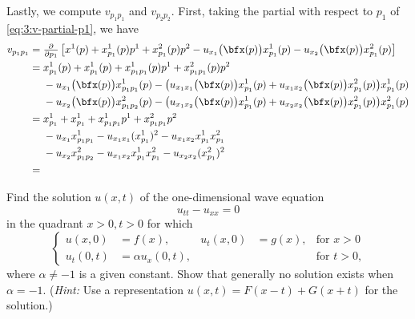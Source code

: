 \begin{solution}
  Lastly, we compute \(v_{p_1p_1}\) and \(v_{p_2p_2}\). First, taking the
  partial with respect to \(p_1\) of \eqref{eq:3:v-partial-p1}, we have
  \begin{equation}
    \label{eq:3:v-partial-p1p1}
    \begin{aligned}
      v_{p_1p_1}%
      &=\tfrac{\partial}{\partial p_1}
      \left[x^1(p)+x^1_{p_1}(p)p^1+x^2_{p_1}(p)p^2
      -u_{x_1}\bigl(\bfx(p)\bigr)x^1_{p_1}(p)
      -u_{x_2}\bigl(\bfx(p)\bigr)x^2_{p_1}(p)\right]\\
      &=x^1_{p_1}(p)+x^1_{p_1}(p)+x^1_{p_1p_1}(p)p^1+x_{p_1p_1}^2(p)p^2\\
      &\phantom{{}={}}-u_{x_1}\bigl(\bfx(p)\bigr)x^1_{p_1p_1}(p)
      -\bigl(u_{x_1x_1}\bigl(\bfx(p)\bigr)x^1_{p_1}(p)
      +u_{x_1x_2}\bigl(\bfx(p)\bigr)x^2_{p_1}(p)\bigr)x_{p_1}^1(p)\\
      &\phantom{{}={}}-u_{x_2}\bigl(\bfx(p)\bigr)x_{p_1p_2}^2(p)
      -\bigl(u_{x_1x_2}\bigl(\bfx(p)\bigr)x^1_{p_1}(p)
      +u_{x_2x_2}\bigl(\bfx(p)\bigr)x^2_{p_1}(p)\bigr)x^2_{p_1}(p)\\
      &=x^1_{p_1}+x^1_{p_1}+x^1_{p_1p_1}p^1+x_{p_1p_1}^2p^2\\
      &\phantom{{}={}}-u_{x_1}x^1_{p_1p_1}-u_{x_1x_1}(x^1_{p_1})^2
      -u_{x_1x_2}x^1_{p_1}x^2_{p_1}\\
      &\phantom{{}={}}-u_{x_2}x^2_{p_1p_2}-u_{x_1x_2}x^1_{p_1}x^2_{p_1}
      -u_{x_2x_2}(x^2_{p_1})^2\\
      &=
    \end{aligned}
  \end{equation}
\end{solution}
\newpage

\begin{problem}
  Find the solution \(u(x,t)\) of the one-dimensional wave equation
  \[
    u_{tt}-u_{xx}=0
  \]
  in the quadrant \(x>0,t>0\) for which
  \[
    \left\{
      \begin{aligned}
        u(x,0)&=f(x),&u_t(x,0)&=g(x),&\text{for \(x>0\)}\\
        u_t(0,t)&=\alpha u_x(0,t),&&&\text{for \(t>0\),}
      \end{aligned}
    \right.
  \]
  where \(\alpha\neq -1\) is a given constant. Show that generally no
  solution exists when \(\alpha=-1\). (\emph{Hint:} Use a representation
  \(u(x,t)=F(x-t)+G(x+t)\) for the solution.)
\end{problem}
\begin{solution}
\end{solution}
\newpage

